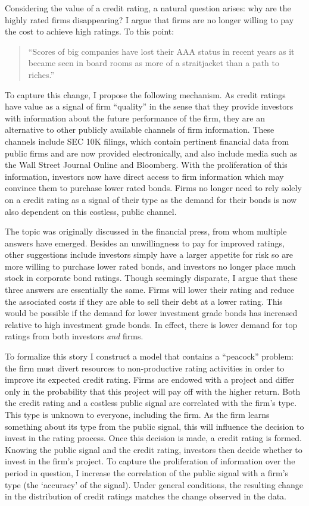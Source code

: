 \documentclass[notitlepage]{article}
\begin{document}
Considering the value of a credit rating, a natural question arises: why are the highly rated firms disappearing? I argue that firms are no longer willing to pay the cost to achieve high ratings. To this point:
\begin{quote}
``Scores of big companies have lost their AAA status in recent years as it became seen in board rooms as more of a straitjacket than a path to riches.''
\end{quote}
To capture this change, I propose the following mechanism. As credit ratings have value as a signal of firm ``quality'' in the sense that they provide investors with information about the future performance of the firm, they are an alternative to other publicly available channels of firm information. These channels include SEC 10K filings, which contain pertinent financial data from public firms and are now provided electronically, and also include media such as the Wall Street Journal Online and Bloomberg. With the proliferation of this information, investors now have direct access to firm information which may convince them to purchase lower rated bonds. Firms no longer need to rely solely on a credit rating as a signal of their type as the demand for their bonds is now also dependent on this costless, public channel.

The topic was originally discussed in the financial press, from whom multiple answers have emerged. Besides an unwillingness to pay for improved ratings, other suggestions include investors simply have a larger appetite for risk so are more willing to purchase lower rated bonds, and investors no longer place much stock in corporate bond ratings. Though seemingly disparate, I argue that these three answers are essentially the same. Firms will lower their rating and reduce the associated costs if they are able to sell their debt at a lower rating. This would be possible if the demand for lower investment grade bonds has increased relative to high investment grade bonds. In effect, there is lower demand for top ratings from both investors \emph{and} firms.

To formalize this story I construct a model that contains a ``peacock'' problem: the firm must divert resources to non-productive rating activities in order to improve its expected credit rating. Firms are endowed with a project and differ only in the probability that this project will pay off with the higher return. Both the credit rating and a costless public signal are correlated with the firm's type. This type is unknown to everyone, including the firm. As the firm learns something about its type from the public signal, this will influence the decision to invest in the rating process. Once this decision is made, a credit rating is formed. Knowing the public signal and the credit rating, investors then decide whether to invest in the firm's project. To capture the proliferation of information over the period in question, I increase the correlation of the public signal with a firm's type (the `accuracy' of the signal). Under general conditions, the resulting change in the distribution of credit ratings matches the change observed in the data.
\end{document}
